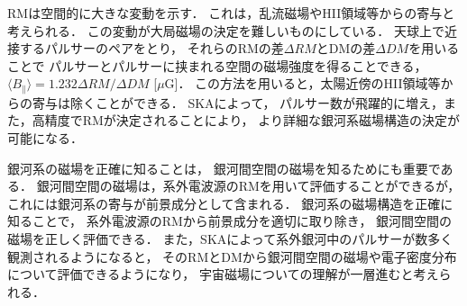 RMは空間的に大きな変動を示す．
これは，乱流磁場やHII領域等からの寄与と考えられる．
この変動が大局磁場の決定を難しいものにしている．
天球上で近接するパルサーのペアをとり，
それらのRMの差$\Delta RM$とDMの差$\Delta DM$を用いることで
パルサーとパルサーに挟まれる空間の磁場強度を得ることできる，
$\langle B_\parallel \rangle = 1.232 \Delta RM/\Delta DM$ [$\mu$G]．
この方法を用いると，太陽近傍のHII領域等からの寄与は除くことができる．
SKAによって，
パルサー数が飛躍的に増え，また，高精度でRMが決定されることにより，
より詳細な銀河系磁場構造の決定が可能になる．

銀河系の磁場を正確に知ることは，
銀河間空間の磁場を知るためにも重要である．
銀河間空間の磁場は，系外電波源のRMを用いて評価することができるが，
これには銀河系の寄与が前景成分として含まれる．
銀河系の磁場構造を正確に知ることで，
系外電波源のRMから前景成分を適切に取り除き，
銀河間空間の磁場を正しく評価できる．
また，SKAによって系外銀河中のパルサーが数多く観測されるようになると，
そのRMとDMから銀河間空間の磁場や電子密度分布について評価できるようになり，
宇宙磁場についての理解が一層進むと考えられる．



